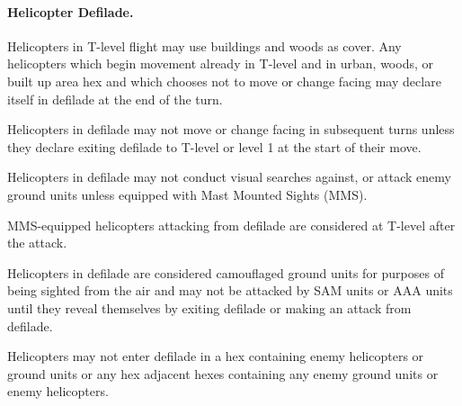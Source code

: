 {{}

\paragraph{Helicopter Defilade.}

Helicopters in T-level flight may use buildings and woods as cover.  Any helicopters which begin movement already in T-level and in urban, woods, or built up area hex and which chooses not to move or change facing may declare itself in defilade at the end of the turn.

Helicopters in defilade may not move or change facing in subsequent turns unless they declare exiting defilade to T-level or level 1 at the start of their move. 

Helicopters in defilade may not conduct visual searches against, or attack enemy ground units unless equipped with Mast Mounted Sights (MMS).

MMS-equipped helicopters attacking from defilade are considered at T-level after the attack.

Helicopters in defilade are considered camouflaged ground units for purposes of being sighted from the air and may not be attacked by SAM units or AAA units until they reveal themselves by exiting defilade or making an attack from defilade.

Helicopters may not enter defilade in a hex containing enemy helicopters or ground units or any hex adjacent hexes containing any enemy ground units or enemy helicopters. 

}
